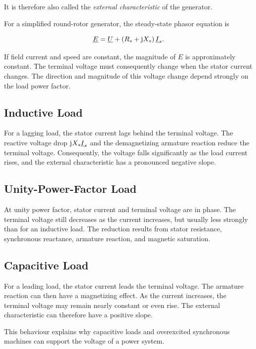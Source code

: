 It is therefore also called the \emph{external characteristic} of the
generator.

For a simplified round-rotor generator, the steady-state phasor equation is

\begin{equation}
  \underline{E}
  =\underline{U}
  +\left(R_s+\mathrm{j} X_s\right)\underline{I}_s.
  \label{eq:sg-generator-phasor}
\end{equation}

If field current and speed are constant, the magnitude of $E$ is approximately
constant. The terminal voltage must consequently change when the stator current
changes. The direction and magnitude of this voltage change depend strongly on
the load power factor.

\subsection{Inductive Load}

For a lagging load, the stator current lags behind the terminal voltage. The
reactive voltage drop $\mathrm{j} X_s\underline{I}_s$ and the demagnetizing armature
reaction reduce the terminal voltage. Consequently, the voltage falls
significantly as the load current rises, and the external characteristic has a
pronounced negative slope.

\subsection{Unity-Power-Factor Load}

At unity power factor, stator current and terminal voltage are in phase. The
terminal voltage still decreases as the current increases, but usually less
strongly than for an inductive load. The reduction results from stator
resistance, synchronous reactance, armature reaction, and magnetic saturation.

\subsection{Capacitive Load}

For a leading load, the stator current leads the terminal voltage. The armature
reaction can then have a magnetizing effect. As the current increases, the
terminal voltage may remain nearly constant or even rise. The external
characteristic can therefore have a positive slope.

This behaviour explains why capacitive loads and overexcited synchronous
machines can support the voltage of a power system.


